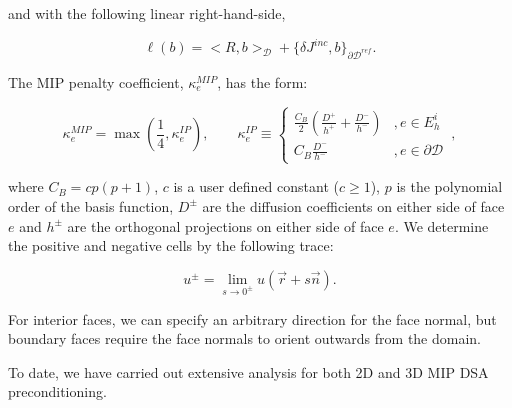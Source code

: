 \documentclass[11pt]{article}
\begin{document}
\noindent and with the following linear right-hand-side,

\begin{equation}
\label{eq::mip_rhs}
\ell(b) = \Big<  R, b  \Big>_{\mathcal{D}} + \Big\{ \delta  J^{inc}, b \Big\}_{\partial \mathcal{D}^{ref}} .
\end{equation}

\noindent The MIP penalty coefficient, $\kappa_e^{MIP}$, has the form:

\begin{equation}
\label{eq::ip_penalty}
\kappa_e^{MIP} = \max(\frac{1}{4}, \kappa_e^{IP}) , \qquad
\kappa_e^{IP}  \equiv 
		\begin{cases}
		\frac{C_B}{2} \left(  \frac{D^+}{h^+} + \frac{D^-}{h^-}  \right) & , e \in E_h^i \\
		C_B \frac{D^-}{h^-}  & , e \in \partial \mathcal{D}
		\end{cases} \, ,
\end{equation}

\noindent where $C_B=cp(p+1)$, $c$ is a user defined constant ($c \geq 1$), $p$ is the polynomial order of the basis function, $D^{\pm}$ are the diffusion coefficients on either side of face $e$ and $h^{\pm}$ are the orthogonal projections on either side of face $e$. We determine the positive and negative cells by the following trace:

\begin{equation}
\label{eq::mip_trace}
u^{\pm} = \lim_{s \rightarrow 0^{\pm}} u (\vec{r} + s \vec{n}) .
\end{equation}

\noindent For interior faces, we can specify an arbitrary direction for the face normal, but boundary faces require the face normals to orient outwards from the domain.

To date, we have carried out extensive analysis for both 2D and 3D MIP DSA preconditioning.
\end{document}
